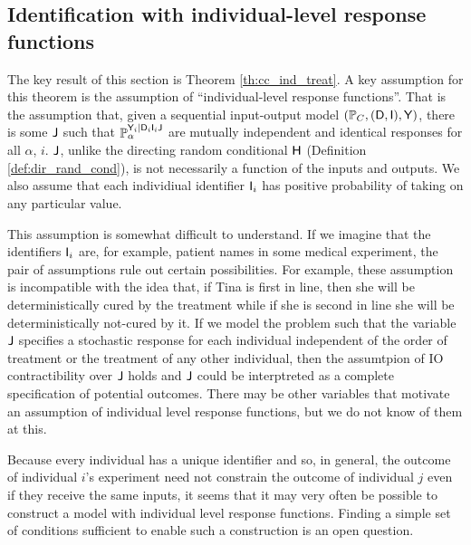 \subsection[Identification]{Identification with individual-level response functions}

The key result of this section is Theorem \ref{th:cc_ind_treat}. A key assumption for this theorem is the assumption of ``individual-level response functions''. That is the assumption that, given a sequential input-output model $(\mathbb{P}_C, (\mathsf{D},\mathsf{I}),\mathsf{Y})$, there is some $\mathsf{J}$ such that $\mathbb{P}_\alpha^{\mathsf{Y}_i|\mathsf{D}_i\mathsf{I}_i\mathsf{J}}$ are mutually independent and identical responses for all $\alpha$, $i$. $\mathsf{J}$, unlike the directing random conditional $\mathsf{H}$ (Definition \ref{def:dir_rand_cond}), is not necessarily a function of the inputs and outputs. We also assume that each individiual identifier $\mathsf{I}_i$ has positive probability of taking on any particular value.

This assumption is somewhat difficult to understand. If we imagine that the identifiers $\mathsf{I}_i$ are, for example, patient names in some medical experiment, the pair of assumptions rule out certain possibilities. For example, these assumption is incompatible with the idea that, if Tina is first in line, then she will be deterministically cured by the treatment while if she is second in line she will be deterministically not-cured by it. If we model the problem such that the variable $\mathsf{J}$ specifies a stochastic response for each individual independent of the order of treatment or the treatment of any other individual, then the assumtpion of IO contractibility over $\mathsf{J}$ holds and $\mathsf{J}$ could be interptreted as a complete specification of potential outcomes. There may be other variables that motivate an assumption of individual level response functions, but we do not know of them at this.

Because every individual has a unique identifier and so, in general, the outcome of individual $i$'s experiment need not constrain the outcome of individual $j$ even if they receive the same inputs, it seems that it may very often be possible to construct a model with individual level response functions. Finding a simple set of conditions sufficient to enable such a construction is an open question.

